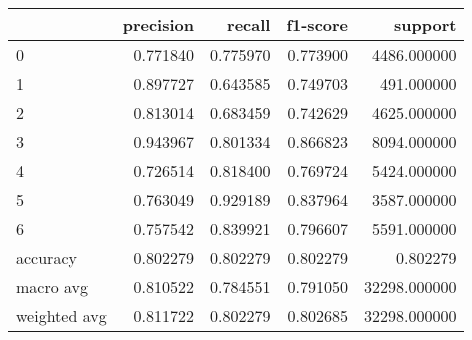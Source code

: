 \begin{tabular}{lrrrr}
\toprule
{} &  precision &    recall &  f1-score &       support \\
\midrule
0            &   0.771840 &  0.775970 &  0.773900 &   4486.000000 \\
1            &   0.897727 &  0.643585 &  0.749703 &    491.000000 \\
2            &   0.813014 &  0.683459 &  0.742629 &   4625.000000 \\
3            &   0.943967 &  0.801334 &  0.866823 &   8094.000000 \\
4            &   0.726514 &  0.818400 &  0.769724 &   5424.000000 \\
5            &   0.763049 &  0.929189 &  0.837964 &   3587.000000 \\
6            &   0.757542 &  0.839921 &  0.796607 &   5591.000000 \\
accuracy     &   0.802279 &  0.802279 &  0.802279 &      0.802279 \\
macro avg    &   0.810522 &  0.784551 &  0.791050 &  32298.000000 \\
weighted avg &   0.811722 &  0.802279 &  0.802685 &  32298.000000 \\
\bottomrule
\end{tabular}
